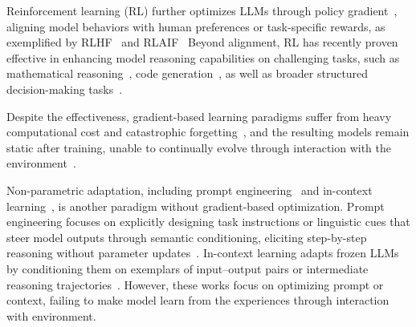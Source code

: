 \documentclass{article}
\begin{document}
Reinforcement learning (RL) further optimizes LLMs through policy gradient~\cite{schulman2017proximal,sutton1999policy,schulman2015trust}, aligning model behaviors with human preferences or task-specific rewards, as exemplified by RLHF~\cite{christiano2017deep,ziegler2019fine,stiennon2020learning,ouyang2022training,rafailov2023direct} and RLAIF~\cite{bai2022training,lee2023rlaif}
Beyond alignment, RL has recently proven effective in enhancing model reasoning capabilities on challenging tasks, such as mathematical reasoning~\cite{shao2024deepseekmath,guo2025deepseek,yu2025dapo,yue2025vapo}, code generation~\cite{le2022coderl,shojaee2023execution,wang2024rlcoder}, as well as broader structured decision-making tasks~\cite{cui2025entropy,hu2025open,zheng2025group,zhang2025survey}.

Despite the effectiveness, gradient-based learning paradigms suffer from heavy computational cost and catastrophic forgetting~\cite{goodfellow2013empirical,hadi2023large}, and the resulting models remain static after training, unable to continually evolve through interaction with the environment~\cite{abbas2023loss}.

Non-parametric adaptation, including prompt engineering~\cite{sahoo2024systematic} and in-context learning~\cite{dong2022survey}, is another paradigm without gradient-based optimization.
Prompt engineering focuses on explicitly designing task instructions or linguistic cues that steer model outputs through semantic conditioning, eliciting step-by-step reasoning without parameter updates~\cite{kojima2022large,reynolds2021prompt,wang2022self,yao2023tree,besta2024graph,sahoo2024systematic}.
In-context learning adapts frozen LLMs by conditioning them on exemplars of input–output pairs or intermediate reasoning trajectories~\cite{brown2020language,wei2022chain,dong2022survey}.
However, these works focus on optimizing prompt or context, failing to make model learn from the experiences through interaction with environment.
\end{document}
